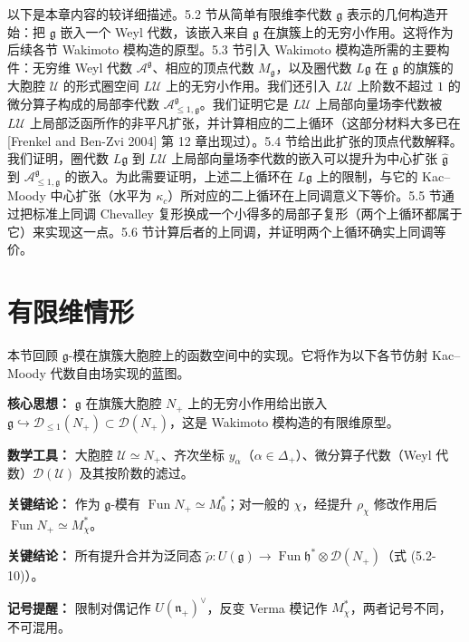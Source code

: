 以下是本章内容的较详细描述。5.2 节从简单有限维李代数 $\mathfrak{g}$ 表示的几何构造开始：把 $\mathfrak{g}$ 嵌入一个 Weyl 代数，该嵌入来自 $\mathfrak{g}$ 在旗簇上的无穷小作用。这将作为后续各节 Wakimoto 模构造的原型。5.3 节引入 Wakimoto 模构造所需的主要构件：无穷维 Weyl 代数 $\mathcal{A}^{\mathfrak{g}}$、相应的顶点代数 $M_{\mathfrak{g}}$，以及圈代数 $L\mathfrak{g}$ 在 $\mathfrak{g}$ 的旗簇的大胞腔 $\mathcal{U}$ 的形式圈空间 $L\mathcal{U}$ 上的无穷小作用。我们还引入 $L\mathcal{U}$ 上阶数不超过 $1$ 的微分算子构成的局部李代数 $\mathcal{A}^{\mathfrak{g}}_{\le1,\mathfrak{g}}$。我们证明它是 $L\mathcal{U}$ 上局部向量场李代数被 $L\mathcal{U}$ 上局部泛函所作的非平凡扩张，并计算相应的二上循环（这部分材料大多已在 [Frenkel and Ben-Zvi 2004] 第 12 章出现过）。5.4 节给出此扩张的顶点代数解释。我们证明，圈代数 $L\mathfrak{g}$ 到 $L\mathcal{U}$ 上局部向量场李代数的嵌入可以提升为中心扩张 $\hat{\mathfrak{g}}$ 到 $\mathcal{A}^{\mathfrak{g}}_{\le1,\mathfrak{g}}$ 的嵌入。为此需要证明，上述二上循环在 $L\mathfrak{g}$ 上的限制，与它的 Kac--Moody 中心扩张（水平为 $\kappa_c$）所对应的二上循环在上同调意义下等价。5.5 节通过把标准上同调 Chevalley 复形换成一个小得多的局部子复形（两个上循环都属于它）来实现这一点。5.6 节计算后者的上同调，并证明两个上循环确实上同调等价。

\section{有限维情形}

本节回顾 $\mathfrak{g}$-模在旗簇大胞腔上的函数空间中的实现。它将作为以下各节仿射 Kac--Moody 代数自由场实现的蓝图。

\begin{keypoints}
    \item \textbf{核心思想：} $\mathfrak{g}$ 在旗簇大胞腔 $N_+$ 上的无穷小作用给出嵌入 $\mathfrak{g}\hookrightarrow\mathcal{D}_{\le1}(N_+)\subset\mathcal{D}(N_+)$，这是 Wakimoto 模构造的有限维原型。
    \item \textbf{数学工具：} 大胞腔 $\mathcal{U}\simeq N_+$、齐次坐标 $y_\alpha$（$\alpha\in\Delta_+$）、微分算子代数（Weyl 代数）$\mathcal{D}(\mathcal{U})$ 及其按阶数的滤过。
    \item \textbf{关键结论：} 作为 $\mathfrak{g}$-模有 $\operatorname{Fun}N_+\simeq M_0^*$；对一般的 $\chi$，经提升 $\rho_\chi$ 修改作用后 $\operatorname{Fun}N_+\simeq M_\chi^*$。
    \item \textbf{关键结论：} 所有提升合并为泛同态 $\widetilde{\rho}:U(\mathfrak{g})\to\operatorname{Fun}\mathfrak{h}^*\otimes\mathcal{D}(N_+)$（式 (5.2-10)）。
    \item \textbf{记号提醒：} 限制对偶记作 $U(\mathfrak{n}_+)^\vee$，反变 Verma 模记作 $M_\chi^*$，两者记号不同，不可混用。
\end{keypoints}

